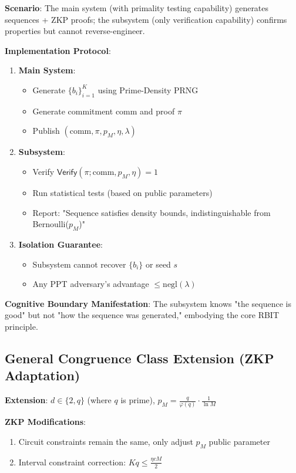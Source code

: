 \documentclass[12pt]{article}
\theoremstyle{plain}
\theoremstyle{definition}
\begin{document}
\textbf{Scenario}: The main system (with primality testing capability) generates sequences + ZKP proofs; the subsystem (only verification capability) confirms properties but cannot reverse-engineer.

\textbf{Implementation Protocol}:

\begin{enumerate}
\item \textbf{Main System}:
\begin{itemize}
   \item Generate $\{b_i\}_{i=1}^K$ using Prime-Density PRNG
   \item Generate commitment $\text{comm}$ and proof $\pi$
   \item Publish $(\text{comm}, \pi, p_M, \eta, \lambda)$
\end{itemize}

\item \textbf{Subsystem}:
\begin{itemize}
   \item Verify $\mathsf{Verify}(\pi; \text{comm}, p_M, \eta) = 1$
   \item Run statistical tests (based on public parameters)
   \item Report: "Sequence satisfies density bounds, indistinguishable from Bernoulli($p_M$)"
\end{itemize}

\item \textbf{Isolation Guarantee}:
\begin{itemize}
   \item Subsystem cannot recover $\{b_i\}$ or seed $s$
   \item Any PPT adversary's advantage $\le \text{negl}(\lambda)$
\end{itemize}
\end{enumerate}

\textbf{Cognitive Boundary Manifestation}: The subsystem knows "the sequence is good" but not "how the sequence was generated," embodying the core RBIT principle.

\subsection{General Congruence Class Extension (ZKP Adaptation)}

\textbf{Extension}: $d \in \{2, q\}$ (where $q$ is prime), $p_M = \frac{q}{\varphi(q)} \cdot \frac{1}{\ln M}$

\textbf{ZKP Modifications}:
\begin{enumerate}
\item Circuit constraints remain the same, only adjust $p_M$ public parameter
\item Interval constraint correction: $Kq \le \frac{\eta c M}{2}$
\end{enumerate}
\end{document}
